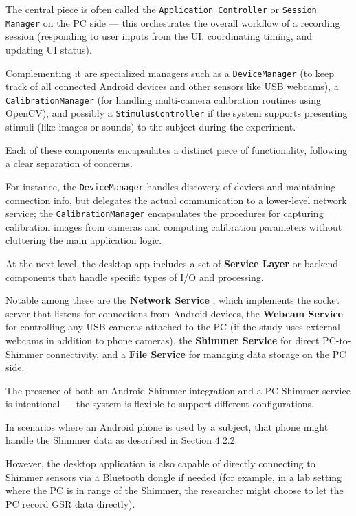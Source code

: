 The central piece is often called the \texttt{Application Controller} or
\texttt{Session Manager} on the PC side --- this orchestrates the overall
workflow of a recording session (responding to user inputs from the UI,
coordinating timing, and updating UI status).

Complementing it are specialized managers such as a \texttt{DeviceManager} (to
keep track of all connected Android devices and other sensors like USB webcams),
a \texttt{CalibrationManager} (for handling multi-camera calibration routines
using OpenCV), and possibly a \texttt{StimulusController} if the system supports
presenting stimuli (like images or sounds) to the subject during the experiment.

Each of these components encapsulates a distinct piece of functionality,
following a clear separation of concerns.

For instance, the \texttt{DeviceManager} handles discovery of devices and
maintaining connection info, but delegates the actual communication to a
lower-level network service; the \texttt{CalibrationManager} encapsulates the
procedures for capturing calibration images from cameras and computing
calibration parameters without cluttering the main application logic.

At the next level, the desktop app includes a set of \textbf{Service Layer}
 or backend components that handle specific types of I/O and processing.

Notable among these are the \textbf{Network Service}
, which implements the socket server that listens for connections from Android devices, the \textbf{Webcam Service}
for controlling any USB cameras attached to the PC (if the study uses external webcams in addition to phone cameras), the \textbf{Shimmer Service}
 for direct PC-to-Shimmer connectivity, and a \textbf{File Service}
 for managing data storage on the PC side.

The presence of both an Android Shimmer integration and a PC Shimmer service is
intentional --- the system is flexible to support different configurations.

In scenarios where an Android phone is used by a subject, that phone might
handle the Shimmer data as described in Section 4.2.2.

However, the desktop application is also capable of directly connecting to
Shimmer sensors via a Bluetooth dongle if needed (for example, in a lab setting
where the PC is in range of the Shimmer, the researcher might choose to let the
PC record GSR data directly).

